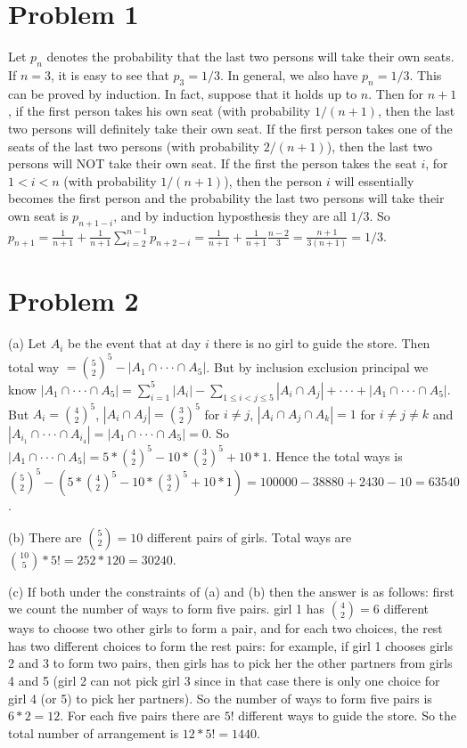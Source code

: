 \documentclass[12pt]{amsart}
\begin{document}
\section{Problem 1}
Let $p_n$ denotes the probability that the last two persons will take their own seats. If $n=3$, it is easy to see that $p_3=1/3$. In general, we also have $p_n=1/3$. This can be proved by induction. In fact, suppose that it holds up to $n$. Then for $n+1$, if the first person takes his own seat (with probability $1/(n+1)$, then the last two persons will definitely take their own seat. If the first person takes  one of the seats of the last two persons (with probability $2/(n+1)$), then the last two persons will NOT take their own seat. If the first the person takes the seat $i$, for $1<i<n$ (with probability $1/(n+1)$), then the person $i$ will essentially becomes the first person and the probability the last two persons will take their own seat is
$p_{n+1-i}$, and by induction hyposthesis they are all $1/3$. So $p_{n+1}=\frac{1}{n+1}+\frac{1}{n+1}\sum_{i=2}^{n-1}p_{n+2-i}=\frac{1}{n+1}+\frac{1}{n+1}\frac{n-2}{3}=\frac{n+1}{3(n+1)}=1/3$. 

\section{Problem 2}
(a) Let $A_i$ be the event that at day $i$ there is no girl to guide the store. Then total way $={5 \choose 2}^5-|A_1\cap\cdot\cdot\cdot\cap A_5|$. But by inclusion exclusion principal we know $|A_1\cap\cdot\cdot\cdot\cap A_5|=\sum_{i=1}^5|A_i|-\sum_{1\leq i<j\leq 5}|A_i\cap A_j|+\cdot\cdot\cdot+|A_1\cap\cdot\cdot\cdot\cap A_5|$. But $A_i={4 \choose 2}^5$, $|A_i\cap A_j|={3 \choose 2}^5$ for $i\neq j$, $|A_i\cap A_j\cap A_k|=1$ for $i\neq j\neq k$ and $|A_{i_1}\cap\cdot\cdot\cdot\cap A_{i_4}|=|A_1\cap\cdot\cdot\cdot\cap A_5|=0$. So $|A_1\cap\cdot\cdot\cdot\cap A_5|=5*{4 \choose 2}^5-10*{3 \choose 2}^5+10*1$. Hence the total ways is ${5 \choose 2}^5-(5*{4 \choose 2}^5-10*{3 \choose 2}^5+10*1)=100000-38880+2430-10=63540$.


(b) There are ${5 \choose 2}=10$ different pairs of girls. Total ways are ${10 \choose 5}*5!=252*120=30240$.


(c) If both under the constraints of (a) and (b) then the answer is as follows: first we count the number of ways to form five pairs. girl 1 has ${4 \choose 2}=6$ different ways to choose two other girls to form a pair, and for each two choices, the rest has two different choices to form the rest pairs: for example, if girl 1 chooses girls 2 and 3 to form two pairs, then girls has to pick her the other partners from girls 4 and 5 (girl 2 can not pick girl 3 since in that case there is only one choice for girl 4 (or 5) to pick her partners). So the number of ways to form five pairs is $6*2=12$. For each five pairs there are $5!$ different ways to guide the store. So the total number of arrangement is $12*5!=1440$.
\end{document}
